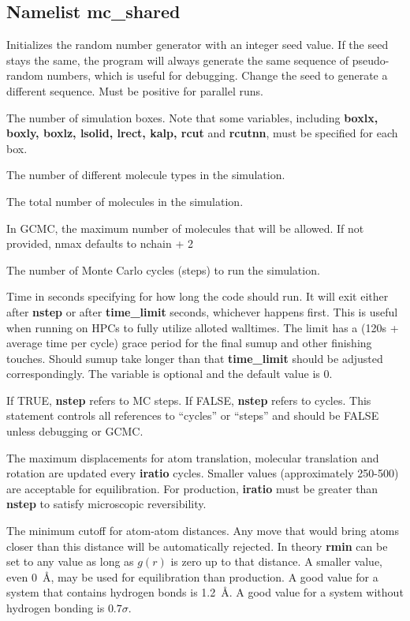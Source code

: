 \documentclass[12pt,letterpaper]{article}
\begin{document}
\subsection{Namelist \textbf{mc\_shared}}
 Initializes the random number generator
with an integer seed value. If the seed stays the same, the
program will always generate the same sequence of
pseudo-random numbers, which is useful for debugging. Change
the seed to generate a different sequence. Must be positive
for parallel runs.

 The number of simulation boxes. Note
that some variables, including {\bf boxlx, boxly, boxlz,
  lsolid, lrect, kalp, rcut} and {\bf rcutnn}, must be
specified for each box.

 The number of different molecule
types in the simulation.

 The total number of molecules in the simulation.

 In GCMC, the maximum number of molecules that
will be allowed. If not provided, nmax defaults to nchain + 2

 The number of Monte Carlo cycles
(steps) to run the simulation.

 Time in seconds specifying for
how long the code should run. It will exit either after {\bf nstep}
or after {\bf time\_limit} seconds, whichever happens first. This
is useful when running on HPCs to fully utilize alloted walltimes. 
The limit has a (120s + average time per cycle) grace period 
for the final sumup and other finishing touches. 
Should sumup take longer than that {\bf time\_limit} 
should be adjusted correspondingly. The variable is
optional and the default value is 0.

 If TRUE, {\bf nstep} refers to MC
steps. If FALSE, {\bf nstep} refers to cycles. This
statement controls all references to ``cycles'' or ``steps''
and should be FALSE unless debugging or GCMC.

 The maximum displacements for atom
translation, molecular translation and rotation are updated
every {\bf iratio} cycles. Smaller values (approximately
250-500) are acceptable for equilibration. For production,
{\bf iratio} must be greater than {\bf nstep} to satisfy
microscopic reversibility.

 The minimum cutoff for atom-atom
distances. Any move that would bring atoms closer than this
distance will be automatically rejected. In theory {\bf
  rmin} can be set to any value as long as $g(r)$ is zero up
to that distance. A smaller value, even 0~{\AA}, may be used
for equilibration than production. A good value for a system
that contains hydrogen bonds is 1.2~\AA. A good value for a
system without hydrogen bonding is $0.7\sigma$.
\end{document}
